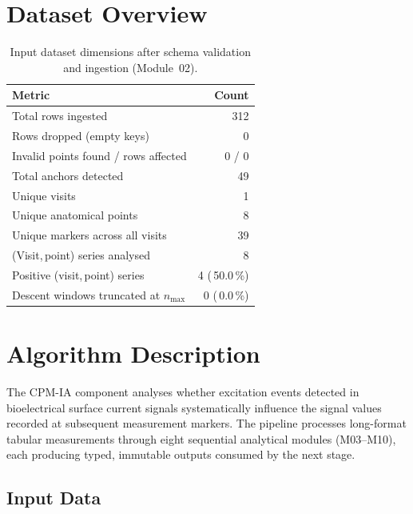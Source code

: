 \documentclass[a4paper,11pt]{article}
\begin{document}
\section{Dataset Overview}

\begin{table}[h!]
\centering
\small
\caption{Input dataset dimensions after schema validation and ingestion (Module~02).}
\begin{tabular}{lr}
\toprule
\textbf{Metric} & \textbf{Count} \\
\midrule
Total rows ingested                        & 312 \\
Rows dropped (empty keys)                  & 0 \\
Invalid points found / rows affected       & 0 / 0 \\
Total anchors detected                     & 49 \\
Unique visits                          & 1 \\
Unique anatomical points               & 8 \\
Unique markers across all visits       & 39 \\
(Visit,\,point) series analysed        & 8 \\
Positive (visit,\,point) series        & 4 (\,50.0\,\%) \\
Descent windows truncated at $n_{\max}$ & 0 (\,0.0\,\%) \\
\bottomrule
\end{tabular}
\end{table}

\section{Algorithm Description}

The CPM-IA component analyses whether excitation events detected in bioelectrical surface
current signals systematically influence the signal values recorded at subsequent measurement
markers. The pipeline processes long-format tabular measurements through eight sequential
analytical modules (M03--M10), each producing typed, immutable outputs consumed by the next
stage.

\subsection{Input Data}
\end{document}

